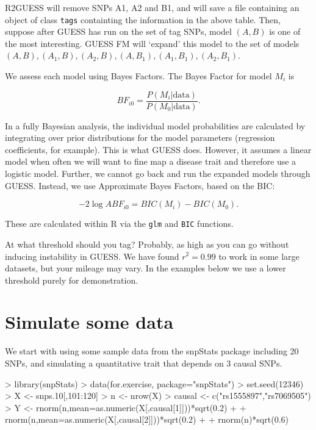 \documentclass[11pt]{article}
\begin{document}
R2GUESS will remove SNPs A1, A2 and B1, and will save a file
containing an object of class \texttt{tags} containting the information in
the above table.  Then, suppose after GUESS has run on the set of tag
SNPs, model $(A,B)$ is one of the most interesting.  GUESS FM will
`expand' this model to the set of models ${(A,B), (A_1,B), (A_2,B),
(A,B_1), (A_1,B_1), (A_2,B_1)}$.  

We assess each model using Bayes Factors.  The Bayes Factor for model
$M_i$ is 

$$BF_{i0} = \frac{P(M_i | \text{data} )}{P(M_0 | \text{data})}.$$

In a fully Bayesian analysis, the individual model
probabilities are calculated by integrating over prior distributions
for the model parameters (regression coefficients, for example).  This
is what GUESS does.  However, it assumes a linear model when often we
will want to fine map a disease trait and therefore use a logistic
model.  Further, we cannot go back and run the expanded models through
GUESS.  Instead, we use Approximate Bayes Factors, based on the BIC:

$$-2 \log{ABF_{i0}} = BIC(M_i) - BIC(M_0).$$

These are calculated within R via the \texttt{glm} and \texttt{BIC} functions.  

At what threshold should you tag?  Probably, as high as you can go
without inducing instability in GUESS.  We have found $r^2=0.99$ to
work in some large datasets, but your mileage may vary.  In the
examples below we use a lower threshold purely for demonstration.

\section{Simulate some data}
\label{sec-3}

We start with using some sample data from the snpStats package
including 20 SNPs, and simulating a quantitative trait that depends
on 3 causal SNPs.

\begin{Schunk}
\begin{Sinput}
> library(snpStats)
> data(for.exercise, package="snpStats")
> set.seed(12346)
> X <- snps.10[,101:120]
> n <- nrow(X)
> causal <- c("rs1555897","rs7069505")
> Y <- rnorm(n,mean=as.numeric(X[,causal[1]]))*sqrt(0.2) +
+   rnorm(n,mean=as.numeric(X[,causal[2]]))*sqrt(0.2) +
+   rnorm(n)*sqrt(0.6)
\end{Sinput}
\end{Schunk}
\end{document}
